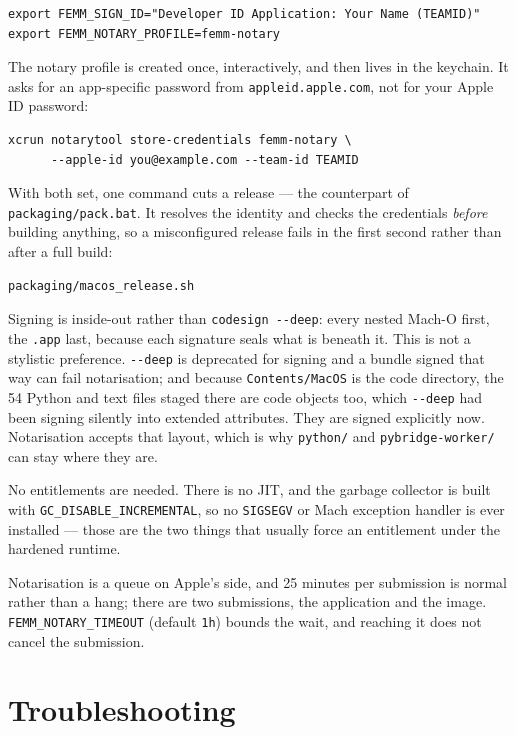 \documentclass[11pt]{article}
\begin{document}
\begin{lstlisting}
export FEMM_SIGN_ID="Developer ID Application: Your Name (TEAMID)"
export FEMM_NOTARY_PROFILE=femm-notary
\end{lstlisting}

The notary profile is created once, interactively, and then lives in the
keychain.  It asks for an app-specific password from
\texttt{appleid.apple.com}, not for your Apple ID password:
\begin{lstlisting}
xcrun notarytool store-credentials femm-notary \
      --apple-id you@example.com --team-id TEAMID
\end{lstlisting}

With both set, one command cuts a release --- the counterpart of
\texttt{packaging/pack.bat}.  It resolves the identity and checks the
credentials \emph{before} building anything, so a misconfigured release
fails in the first second rather than after a full build:
\begin{lstlisting}
packaging/macos_release.sh
\end{lstlisting}

Signing is inside-out rather than \texttt{codesign -{}-deep}: every
nested Mach-O first, the \texttt{.app} last, because each signature
seals what is beneath it.  This is not a stylistic preference.
\texttt{-{}-deep} is deprecated for signing and a bundle signed that way
can fail notarisation; and because \texttt{Contents/MacOS} is the code
directory, the 54 Python and text files staged there are code objects
too, which \texttt{-{}-deep} had been signing silently into extended
attributes.  They are signed explicitly now.  Notarisation accepts that
layout, which is why \texttt{python/} and \texttt{pybridge-worker/} can
stay where they are.

No entitlements are needed.  There is no JIT, and the garbage collector
is built with \texttt{GC\_DISABLE\_INCREMENTAL}, so no \texttt{SIGSEGV}
or Mach exception handler is ever installed --- those are the two things
that usually force an entitlement under the hardened runtime.

Notarisation is a queue on Apple's side, and 25 minutes per submission
is normal rather than a hang; there are two submissions, the application
and the image.  \texttt{FEMM\_NOTARY\_TIMEOUT} (default \texttt{1h})
bounds the wait, and reaching it does not cancel the submission.

\section{Troubleshooting}
\end{document}
